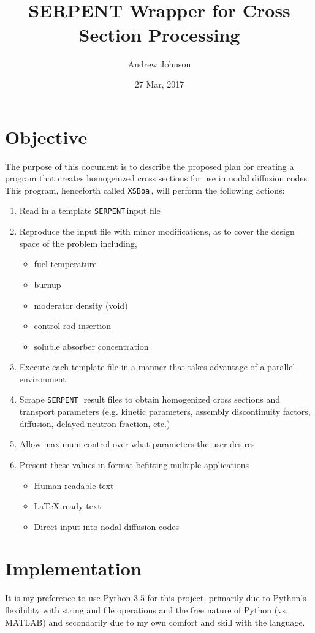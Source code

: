 \documentclass{article}
\title{\boa \\ SERPENT Wrapper for Cross Section Processing}
\author{Andrew Johnson}
\date{27 Mar, 2017}
\newcommand{\boa}{\texttt{XSBoa}\,}
\newcommand{\serp}{\texttt{SERPENT}\,}
\begin{document}
	\maketitle
	\section{Objective}
	The purpose of this document is to describe the proposed plan for creating a program that creates homogenized cross sections for use in nodal diffusion codes.
	This program, henceforth called \boa, will perform the following actions:
	\begin{enumerate}
		\item Read in a template \serp input file
		\item Reproduce the input file with minor modifications, as to cover the design space of the problem including,
		\begin{itemize}
			\item fuel temperature
			\item burnup
			\item moderator density (void)
			\item control rod insertion
			\item soluble absorber concentration
		\end{itemize}
		\item Execute each template file in a manner that takes advantage of a parallel environment
		\item Scrape \serp\, result files to obtain homogenized cross sections and transport parameters (e.g. kinetic parameters, assembly discontinuity factors, diffusion, delayed neutron fraction, etc.)
		\item Allow maximum control over what parameters the user desires
		\item Present these values in format befitting multiple applications 
		\begin{itemize}
			\item Human-readable text
			\item \LaTeX-ready text
			\item Direct input into nodal diffusion codes
		\end{itemize}
	\end{enumerate}

	\section{Implementation} \label{sec:implement}
	It is my preference to use Python 3.5 for this project, primarily due to Python's flexibility with string and file operations and the free nature of Python (vs. MATLAB) and secondarily due to my own comfort and skill with the language.
\end{document}

